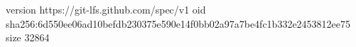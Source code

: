 version https://git-lfs.github.com/spec/v1
oid sha256:6d550ee06ad10befdb230375e590e14f0bb02a97a7be4fc1b332e2453812ee75
size 32864
